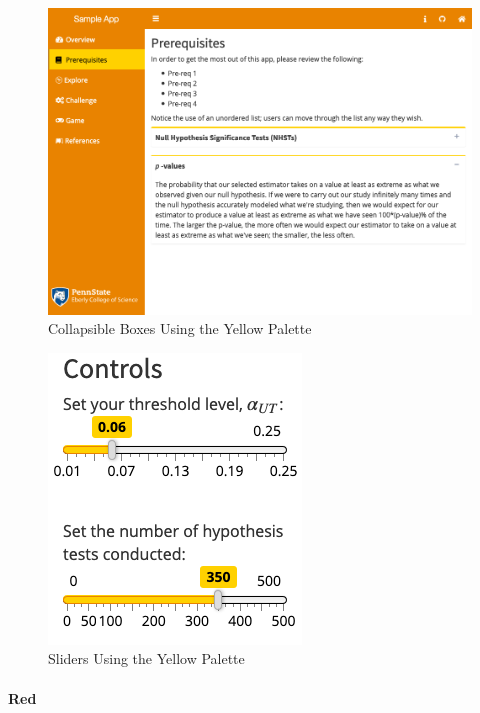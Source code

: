 \documentclass[
]{book}
\begin{document}
\begin{figure}

{\centering \includegraphics[width=14in]{images/yellowCollapse} 

}

\caption{Collapsible Boxes Using the Yellow Palette}\label{fig:yellowAction2}
\end{figure}

\begin{figure}

{\centering \includegraphics{images/yellowSliders} 

}

\caption{Sliders Using the Yellow Palette}\label{fig:yellowAction3}
\end{figure}

\hypertarget{red}{%
\paragraph{Red}\label{red}}
\end{document}
